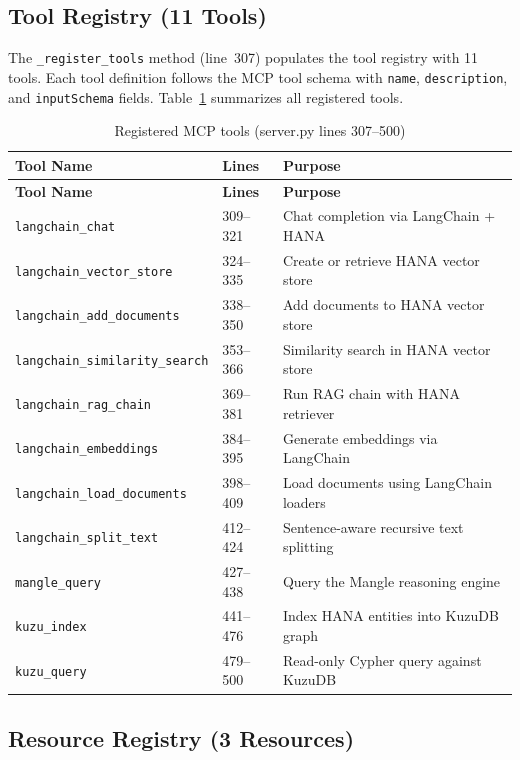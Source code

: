 \documentclass[11pt]{article}
\newcommand{\code}[1]{\texttt{#1}}
\begin{document}
\subsection{Tool Registry (11 Tools)}

The \code{\_register\_tools} method (line~307) populates the tool registry with
11 tools.  Each tool definition follows the MCP tool schema with
\code{name}, \code{description}, and \code{inputSchema} fields.
Table~\ref{tab:tools} summarizes all registered tools.

\begin{longtable}{@{}llp{5.5cm}@{}}
\caption{Registered MCP tools (server.py lines 307--500)}
\label{tab:tools} \\
\toprule
\textbf{Tool Name} & \textbf{Lines} & \textbf{Purpose} \\
\midrule
\endfirsthead
\toprule
\textbf{Tool Name} & \textbf{Lines} & \textbf{Purpose} \\
\midrule
\endhead
\bottomrule
\endlastfoot
\code{langchain\_chat}                & 309--321  & Chat completion via LangChain + HANA \\
\code{langchain\_vector\_store}       & 324--335  & Create or retrieve HANA vector store \\
\code{langchain\_add\_documents}      & 338--350  & Add documents to HANA vector store \\
\code{langchain\_similarity\_search}  & 353--366  & Similarity search in HANA vector store \\
\code{langchain\_rag\_chain}          & 369--381  & Run RAG chain with HANA retriever \\
\code{langchain\_embeddings}          & 384--395  & Generate embeddings via LangChain \\
\code{langchain\_load\_documents}     & 398--409  & Load documents using LangChain loaders \\
\code{langchain\_split\_text}         & 412--424  & Sentence-aware recursive text splitting \\
\code{mangle\_query}                  & 427--438  & Query the Mangle reasoning engine \\
\code{kuzu\_index}                    & 441--476  & Index HANA entities into KuzuDB graph \\
\code{kuzu\_query}                    & 479--500  & Read-only Cypher query against KuzuDB \\
\end{longtable}

\subsection{Resource Registry (3 Resources)}
\end{document}
